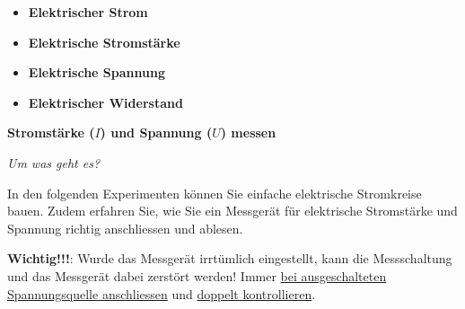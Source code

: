 \documentclass[11pt]{article}
\begin{document}
\vspace{-0.3cm}
\begin{itemize}[label=-]
    \item \textbf{Elektrischer Strom}
	

    \item \textbf{Elektrische Stromstärke} 
	

    \item \textbf{Elektrische Spannung}
	

    \item \textbf{Elektrischer Widerstand}

\end{itemize}


\newpage

\textbf{Stromstärke ($I$) und Spannung ($U$) messen}

\textit{Um was geht es?}

In den folgenden Experimenten können Sie einfache elektrische Stromkreise bauen. Zudem erfahren Sie, wie Sie ein Messgerät für elektrische Stromstärke und Spannung richtig anschliessen und ablesen.

\vspace{0.2cm}

\color{red}
\textbf{Wichtig!!!}: Wurde das Messgerät irrtümlich eingestellt, kann die Messschaltung und das Messgerät dabei zerstört werden! Immer \underline{bei ausgeschalteten Spannungsquelle anschliessen} und \underline{doppelt kontrollieren}.
\color{black}

\vspace{0.5cm}
\end{document}
